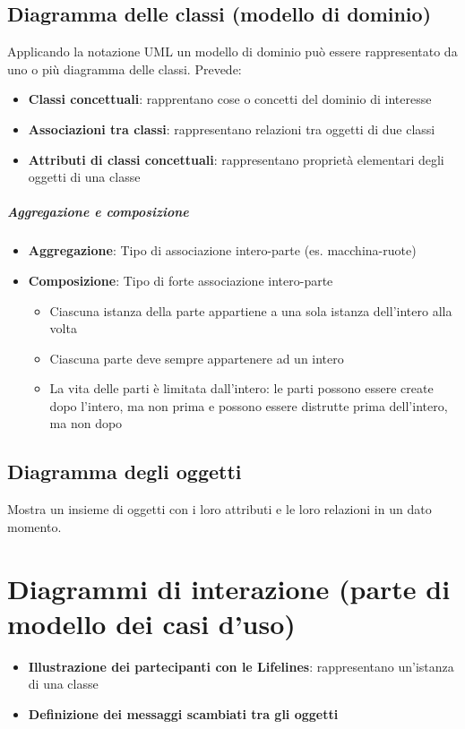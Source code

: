 \documentclass[12pt]{article}
\begin{document}
\subsection{Diagramma delle classi (modello di dominio)}
Applicando la notazione UML un modello di dominio può essere rappresentato da uno o più diagramma delle classi. Prevede:
\begin{itemize}
    \item \textbf{Classi concettuali}: rapprentano cose o concetti del dominio di interesse
    \item \textbf{Associazioni tra classi}: rappresentano relazioni tra oggetti di due classi
    \item \textbf{Attributi di classi concettuali}: rappresentano proprietà elementari degli oggetti di una classe
\end{itemize}
\subparagraph{Aggregazione e composizione}
\begin{itemize}
    \item \textbf{Aggregazione}: Tipo di associazione intero-parte (es. macchina-ruote)
    \item \textbf{Composizione}: Tipo di forte associazione intero-parte
    \begin{itemize}
        \item Ciascuna istanza della parte appartiene a una sola istanza dell'intero alla volta
        \item Ciascuna parte deve sempre appartenere ad un intero
        \item La vita delle parti è limitata dall'intero: le parti possono essere create dopo l'intero, ma non prima e possono essere distrutte prima dell'intero, ma non dopo
    \end{itemize}
\end{itemize}
\subsection{Diagramma degli oggetti}
Mostra un insieme di oggetti con i loro attributi e le loro relazioni in un dato momento.

\section{Diagrammi di interazione (parte di modello dei casi d'uso)}
\begin{itemize}
    \item \textbf{Illustrazione dei partecipanti con le Lifelines}: rappresentano un'istanza di una classe
    \item \textbf{Definizione dei messaggi scambiati tra gli oggetti}
\end{itemize}
\end{document}
